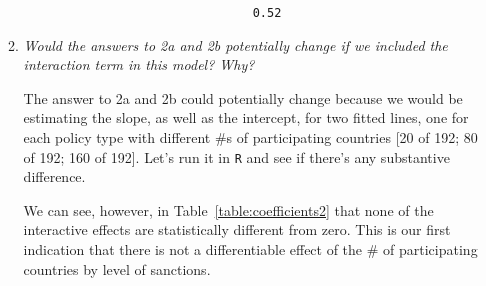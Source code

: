 \documentclass[12pt,letterpaper]{article}
\begin{document}
\begin{enumerate}
\begin{enumerate}
						 
						
						\begin{verbatim}
								0.52 
						\end{verbatim}
		
		\item
		\textit{Would the answers to 2a and 2b potentially change if we included the interaction term in this model? Why? }
		
		The answer to 2a and 2b could potentially change because we would be estimating the slope, as well as the intercept, for two fitted lines, one for each policy type with different \#s of participating countries [20 of 192; 80 of 192; 160 of 192]. Let’s run it in \texttt{R} and see if there’s any substantive difference.
		
					 
		
		We can see, however, in Table~\ref{table:coefficients2} that none of the interactive effects are statistically different from zero. This is our first indication that there is not a differentiable effect of the \# of participating countries by level of sanctions.
		

\end{enumerate}
\end{enumerate}
\end{document}
